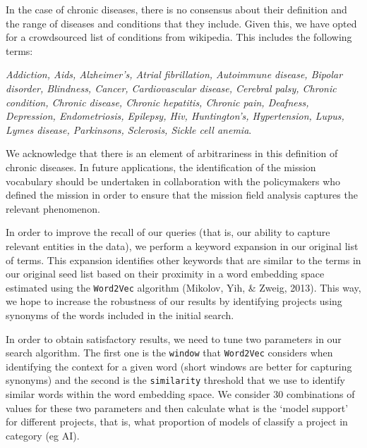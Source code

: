 \documentclass[11pt]{article}
\begin{document}
In the case of chronic diseases, there is no consensus about their definition and the range of diseases and conditions that they include. Given this, we have opted for a crowdsourced list of conditions from wikipedia. This includes the following terms: 

\emph{Addiction, Aids, Alzheimer’s, Atrial fibrillation, Autoimmune disease, Bipolar disorder, Blindness, Cancer, Cardiovascular disease, Cerebral palsy, Chronic condition, Chronic disease, Chronic hepatitis, Chronic pain, Deafness, Depression, Endometriosis, Epilepsy, Hiv, Huntington’s, Hypertension, Lupus, Lymes disease, Parkinsons, Sclerosis, Sickle cell anemia}.

We acknowledge that there is an element of arbitrariness in this definition of chronic diseases. In future applications, the identification of the mission vocabulary should be undertaken in collaboration with the policymakers who defined the mission in order to ensure that the mission field analysis captures the relevant phenomenon.

In order to improve the recall of our queries (that is, our ability to capture relevant entities in the data), we perform a keyword expansion in our original list of terms. This expansion identifies other keywords that are similar to the terms in our original seed list based on their proximity in a word embedding space estimated using the \texttt{Word2Vec} algorithm (Mikolov, Yih, \& Zweig, 2013). This way, we hope to increase the robustness of our results by identifying projects using synonyms of the words included in the initial search.

In order to obtain satisfactory results, we need to tune two parameters in our search algorithm. The first one is the \texttt{window} that \texttt{Word2Vec} considers when identifying the context for a given word (short windows are better for capturing synonyms) and the second is the \texttt{similarity} threshold that we use to identify similar words within the word embedding space. We consider 30 combinations of values for these two parameters and then calculate what is the `model support' for different projects, that is, what proportion of models of classify a project in category (eg AI). 
\end{document}
